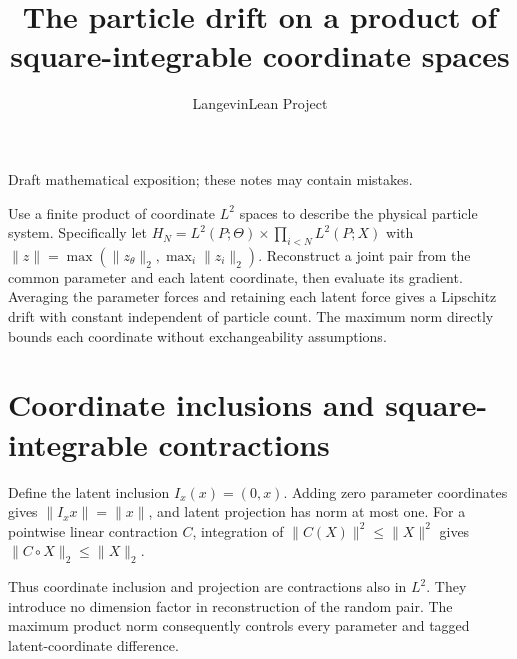 \documentclass[11pt,a4paper]{article}
\title{\texorpdfstring{The particle drift on a product of square-integrable coordinate spaces}{The particle drift on a product of square-integrable coordinate spaces}}
\author{LangevinLean Project}
\date{}
\begin{document}
\maketitle
Draft mathematical exposition; these notes may contain mistakes.


Use a finite product of coordinate \(L^2\) spaces to describe the physical particle system. Specifically let \(H_N=L^2(P;\Theta)\times\prod_{i<N}L^2(P;X)\) with \(\|z\|=\max(\|z_\theta\|_2,\max_i\|z_i\|_2)\). Reconstruct a joint pair from the common parameter and each latent coordinate, then evaluate its gradient. Averaging the parameter forces and retaining each latent force gives a Lipschitz drift with constant independent of particle count. The maximum norm directly bounds each coordinate without exchangeability assumptions.


\section{\texorpdfstring{Coordinate inclusions and square-integrable contractions}{Coordinate inclusions and square-integrable contractions}}


Define the latent inclusion \(I_x(x)=(0,x)\). Adding zero parameter coordinates gives \(\|I_xx\|=\|x\|\), and latent projection has norm at most one. For a pointwise linear contraction \(C\), integration of \(\|C(X)\|^2\le\|X\|^2\) gives \(\|C\circ X\|_2\le\|X\|_2\).



Thus coordinate inclusion and projection are contractions also in \(L^2\). They introduce no dimension factor in reconstruction of the random pair. The maximum product norm consequently controls every parameter and tagged latent-coordinate difference.
\end{document}

